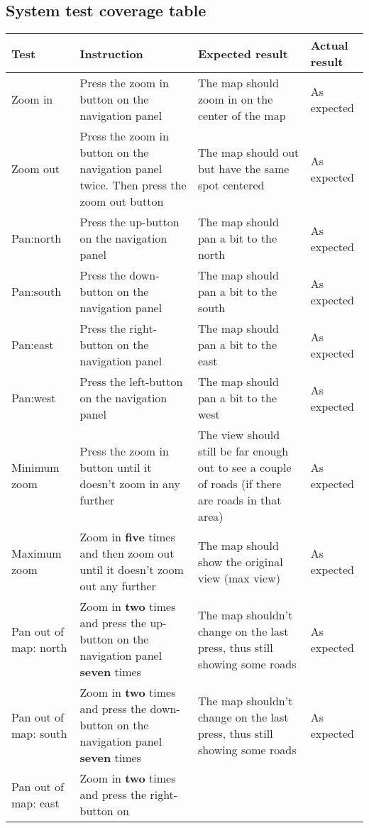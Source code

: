 \subsection{System test coverage table}
\begin{centering}
\begin{longtable}{|p{}|p{}|p{}|p{}|}
\hline
Test & Instruction & Expected result & Actual result\\
\hline
Zoom in & Press the zoom in button on the navigation panel & The map should zoom
in on the center of the map & As expected\\
\hline
Zoom out & Press the zoom in button on the navigation panel twice. Then press
the zoom out button & The map should out but have the same spot centered & As
expected\\
\hline
\hline
Pan:north & Press the up-button on the navigation panel & The map should pan a
bit to the north & As expected\\
\hline
Pan:south & Press the down-button on the navigation panel & The map should pan a
bit to the south & As expected\\
\hline
Pan:east & Press the right-button on the navigation panel & The map should pan a
bit to the east & As expected\\
\hline
Pan:west & Press the left-button on the navigation panel & The map should pan a
bit to the west & As expected\\
\hline
\hline
Minimum zoom & Press the zoom in button until it doesn't zoom in any further &
The view should still be far enough out to see a couple of roads (if there are
roads in that area) & As expected\\
\hline
Maximum zoom & Zoom in \textbf{five} times and then zoom out until it doesn't
zoom out any further & The map should show the original view (max view) & As expected\\
\hline
\hline
Pan out of map: north & Zoom in \textbf{two} times and press the up-button on
the navigation panel \textbf{seven} times & The map shouldn't change on the last
press, thus still showing some roads & As expected\\
\hline
Pan out of map: south & Zoom in \textbf{two} times and press the down-button on
the navigation panel \textbf{seven} times & The map shouldn't change on the last
press, thus still showing some roads & As expected\\
\hline
Pan out of map: east & Zoom in \textbf{two} times and press the right-button on

\end{longtable}
\end{centering}
